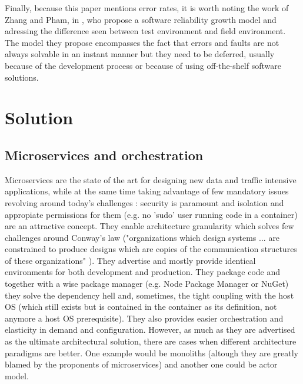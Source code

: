 \documentclass[conference]{IEEEtran}
\begin{document}
    Finally, because this paper mentions error rates, it is worth noting the work of Zhang and Pham, in \cite{b2}, who propose a software reliability growth model and adressing the difference seen between test environment and field environment. The model they propose encompasses the fact that errors and faults are not always solvable in an instant manner but they need to be deferred, usually because of the development process or because of using off-the-shelf software solutions.
    
\section{Solution}

\subsection{Microservices and orchestration}
    Microservices are the state of the art for designing new data and traffic intensive applications, while at the same time taking advantage of few mandatory issues revolving around today's challenges \cite{}: security is paramount and isolation and appropiate permissions for them (e.g. no 'sudo' user running code in a container) are an attractive concept. They enable architecture granularity which solves few challenges around Conway's law ("organizations which design systems ... are constrained to produce designs which are copies of the communication structures of these organizations" \cite{b4}). They advertise and mostly provide identical environments for both development and production. They package code and together with a wise package manager (e.g. Node Package Manager or NuGet) they solve the dependency hell and, sometimes, the tight coupling with the host OS (which still exists but is contained in the container as its definition, not anymore a host OS prerequisite). They also provides easier orchestration and elasticity in demand and configuration. However, as much as they are advertised as the ultimate architectural solution, there are cases when different architecture paradigms are better. One example would be monoliths (altough they are greatly blamed by the proponents of microservices) and another one could be actor model.

    

\end{document}
